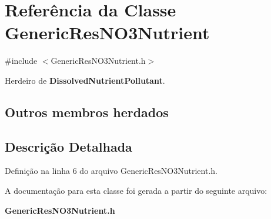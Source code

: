 \section{Referência da Classe Generic\+Res\+N\+O3\+Nutrient}
\label{class_generic_res_n_o3_nutrient}


{\ttfamily \#include $<$Generic\+Res\+N\+O3\+Nutrient.\+h$>$}



Herdeiro de {\bf Dissolved\+Nutrient\+Pollutant}.

\subsection*{Outros membros herdados}


\subsection{Descrição Detalhada}


Definição na linha 6 do arquivo Generic\+Res\+N\+O3\+Nutrient.\+h.



A documentação para esta classe foi gerada a partir do seguinte arquivo\+:\begin{DoxyCompactItemize}
\item 
{\bf Generic\+Res\+N\+O3\+Nutrient.\+h}\end{DoxyCompactItemize}
